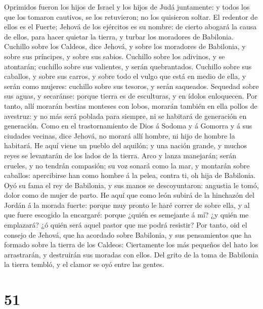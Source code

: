 Oprimidos fueron los hijos de Israel y los hijos de Judá juntamente: y
todos los que los tomaron cautivos, se los retuvieron; no los quisieron
soltar.  El redentor de ellos es el Fuerte; Jehová de los
ejércitos es su nombre: de cierto abogará la causa de ellos, para hacer
quietar la tierra, y turbar los moradores de Babilonia. 
Cuchillo sobre los Caldeos, dice Jehová, y sobre los moradores de
Babilonia, y sobre sus príncipes, y sobre sus sabios. 
Cuchillo sobre los adivinos, y se atontarán; cuchillo sobre sus
valientes, y serán quebrantados.  Cuchillo sobre sus
caballos, y sobre sus carros, y sobre todo el vulgo que está en medio de
ella, y serán como mujeres: cuchillo sobre sus tesoros, y serán
saqueados.  Sequedad sobre sus aguas, y secaránse: porque
tierra es de esculturas, y en ídolos enloquecen.  Por
tanto, allí morarán bestias monteses con lobos, morarán también en ella
pollos de avestruz: y no más será poblada para siempre, ni se habitará
de generación en generación.  Como en el trastornamiento de
Dios á Sodoma y á Gomorra y á sus ciudades vecinas, dice Jehová, no
morará allí hombre, ni hijo de hombre la habitará.  He aquí
viene un pueblo del aquilón; y una nación grande, y muchos reyes se
levantarán de los lados de la tierra.  Arco y lanza
manejarán; serán crueles, y no tendrán compasión; su voz sonará como la
mar, y montarán sobre caballos: apercibirse han como hombre á la pelea,
contra ti, oh hija de Babilonia.  Oyó su fama el rey de
Babilonia, y sus manos se descoyuntaron: angustia le tomó, dolor como de
mujer de parto.  He aquí que como león subirá de la
hinchazón del Jordán á la morada fuerte: porque muy pronto le haré
correr de sobre ella, y al que fuere escogido la encargaré: porque
¿quién es semejante á mí? ¿y quién me emplazará? ¿ó quién será aquel
pastor que me podrá resistir?  Por tanto, oid el consejo de
Jehová, que ha acordado sobre Babilonia, y sus pensamientos que ha
formado sobre la tierra de los Caldeos: Ciertamente los más pequeños del
hato los arrastrarán, y destruirán sus moradas con ellos. 
Del grito de la toma de Babilonia la tierra tembló, y el clamor se oyó
entre las gentes.

\hypertarget{section-50}{%
\section{51}\label{section-50}}

